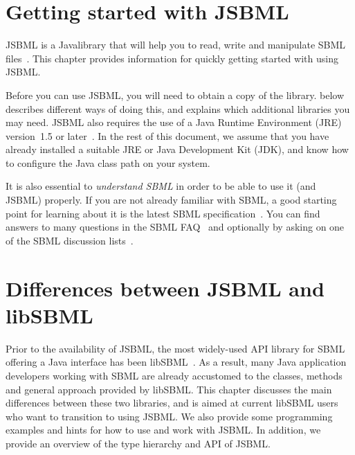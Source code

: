 \documentclass[draftdoc]{JSBMLdoc}
\begin{document}
\maketitlepage
\maketableofcontents
\clearpage


\chapter{Getting started with JSBML}
\label{chp:getting-started}

JSBML is a Java\TTra library that will help you to read, write and
manipulate SBML files~\cite{Draeger2011a, Draeger2011b}. This chapter
provides information for quickly getting started with using JSBML.

Before you can use JSBML, you will need to obtain a copy of the library.
 below describes different ways of doing
this, and explains which additional libraries you may need. JSBML also
requires the use of a Java Runtime Environment (JRE) version~1.5 or
later~\cite{JavaDownloadURL}.  In the
rest of this document, we assume that you have already installed a suitable
JRE or Java Development Kit (JDK), and know how to configure the Java class
path on your system. 

It is also essential to \emph{understand SBML} in order to be able to use
it (and JSBML) properly. If you are not already familiar with SBML, a good
starting point for learning about it is the latest SBML
specification~\cite{SBMLspecs}. You can find answers to many questions in
the SBML FAQ~\cite{SBMLFAQ} and optionally by asking on one of the SBML
discussion lists~\cite{SBMLforums}.






\chapter{Differences between JSBML and libSBML}
\label{chp:jsbml-libsbml-diffs}

Prior to the availability of JSBML, the most widely-used API library for
SBML offering a Java interface has been libSBML~\cite{Bornstein2008}. As a
result, many Java application developers working with SBML are already
accustomed to the classes, methods and general approach provided by
libSBML. This chapter discusses the main differences between these two
libraries, and is aimed at current libSBML users who want to transition to
using JSBML. We also provide some programming examples and hints for how
to use and work with JSBML. In addition, we provide an overview of the type hierarchy 
and API of JSBML.
\end{document}
